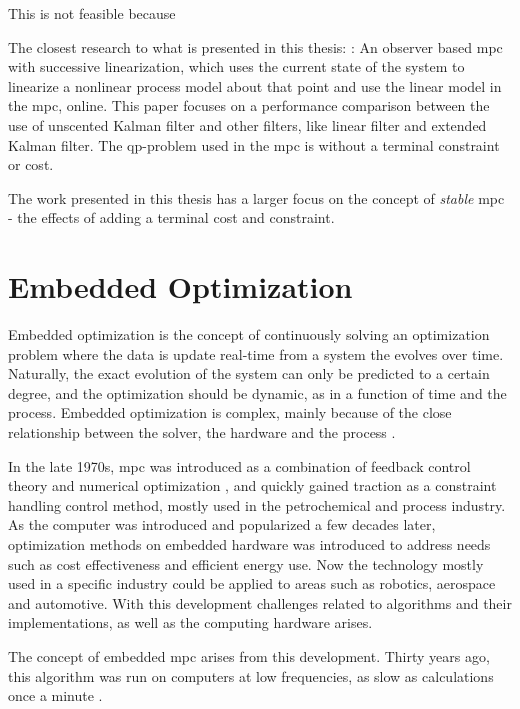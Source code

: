 This is not feasible because



The closest research to what is presented in this thesis:
\cite{Zhai2013}: An observer based \acrshort{mpc} with successive linearization, which uses the current state of the system to linearize a nonlinear process model about that point and use the linear model in the \acrshort{mpc}, online. This paper focuses on a performance comparison between the use of unscented Kalman filter and other filters, like linear filter and extended Kalman filter. The \acrshort{qp}-problem used in the \acrshort{mpc} is without a terminal constraint or cost.

The work presented in this thesis has a larger focus on the concept of \textit{stable} \acrlong{mpc} - the effects of adding a terminal cost and constraint.



\section{Embedded Optimization}


Embedded optimization is the concept of continuously solving an optimization problem where the data is update real-time from a system the evolves over time. Naturally, the exact evolution of the system can only be predicted to a certain degree, and the optimization should be dynamic, as in a function of time and the process. Embedded optimization is complex, mainly because of the close relationship between the solver, the hardware and the process \cite{embedded_optimization}.

In the late 1970s, \acrlong{mpc} was introduced as a combination of feedback control theory and numerical optimization \cite{mpc_early}, and quickly gained traction as a constraint handling control method, mostly used in the petrochemical and process industry. As the computer was introduced and popularized a few decades later, optimization methods on embedded hardware was introduced to address needs such as cost effectiveness and efficient energy use. Now the technology mostly used in a specific industry could be applied to areas such as robotics, aerospace and automotive. With this development challenges related to algorithms and their implementations, as well as the computing hardware arises. 

The concept of embedded \acrshort{mpc} arises from this development. Thirty years ago, this algorithm was run on computers at low frequencies, as slow as calculations once a minute \cite{qin_badgwell}. 

